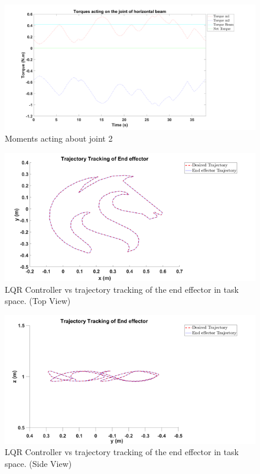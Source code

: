 \documentclass{UoNMCHA}
\numberwithin{equation}{section}
\begin{document}
	

	
	\begin{figure}[H]
		\begin{center}
			\includegraphics[width=1\linewidth]{figs/Picture31}
			\caption{Moments acting about joint 2}
			\label{figs/Picture31}
		\end{center}
	\end{figure}
	

	
	\begin{figure}[H]
		\begin{center}
			\includegraphics[width=1\linewidth]{figs/Picture32}
			\caption{LQR Controller vs trajectory tracking of the end effector in task space. (Top View)}
			\label{figs/Picture32}
		\end{center}
	\end{figure}
	
	\begin{figure}[H]
		\begin{center}
			\includegraphics[width=1\linewidth]{figs/Picture322}
			\caption{LQR Controller vs trajectory tracking of the end effector in task space. (Side View)}
			\label{figs/Picture322}
		\end{center}
	\end{figure}
	
\end{document}

